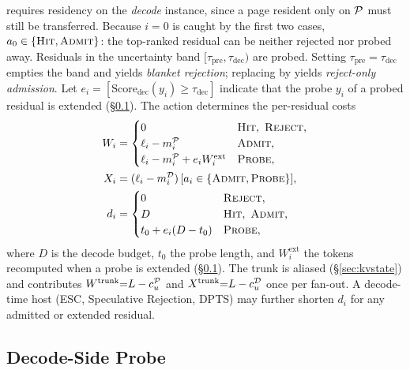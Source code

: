 \noindent
\Hit requires residency on the \emph{decode} instance, since a page resident only on $\mathcal{P}$ must still be transferred.
Because $i{=}0$ is caught by the first two cases, $a_0\in\{\textsc{Hit},\textsc{Admit}\}$: the top-ranked residual can be neither rejected nor probed away.
Residuals in the uncertainty band $[\tau_{\mathrm{pre}},\tau_{\mathrm{dec}})$ are probed.
Setting $\tau_{\mathrm{pre}}{=}\tau_{\mathrm{dec}}$ empties the band and yields \emph{blanket rejection}; replacing \Probe by \Admit yields \emph{reject-only admission}.
Let $e_i{=}[\mathrm{Score}_{\mathrm{dec}}(y_i)\ge\tau_{\mathrm{dec}}]$ indicate that the probe $y_i$ of a probed residual is extended (\S\ref{sec:split}).
The action determines the per-residual costs
\begin{align}
W_i &=
\begin{cases}
0 & \textsc{Hit},\ \textsc{Reject},\\
\ell_i-m_i^{\mathcal{P}} & \textsc{Admit},\\
\ell_i-m_i^{\mathcal{P}}+e_iW_i^{\mathrm{ext}} & \textsc{Probe},
\end{cases}
\label{eq:work}\\
X_i &= (\ell_i-m_i^{\mathcal{D}})\,[a_i\in\{\textsc{Admit},\textsc{Probe}\}],
\label{eq:xfer}\\
d_i &=
\begin{cases}
0 & \textsc{Reject},\\
D & \textsc{Hit},\ \textsc{Admit},\\
t_0+e_i(D-t_0) & \textsc{Probe},
\end{cases}
\label{eq:dec}
\end{align}
where $D$ is the decode budget, $t_0$ the probe length, and $W_i^{\mathrm{ext}}$ the tokens recomputed when a probe is extended (\S\ref{sec:split}).
The trunk is aliased (\S\ref{sec:kvstate}) and contributes $W^{\mathrm{trunk}}{=}L-c_u^{\mathcal{P}}$ and $X^{\mathrm{trunk}}{=}L-c_u^{\mathcal{D}}$ once per fan-out.
A decode-time host (ESC, Speculative Rejection, DPTS) may further shorten $d_i$ for any admitted or extended residual.

\subsection{Decode-Side Probe}
\label{sec:split}

